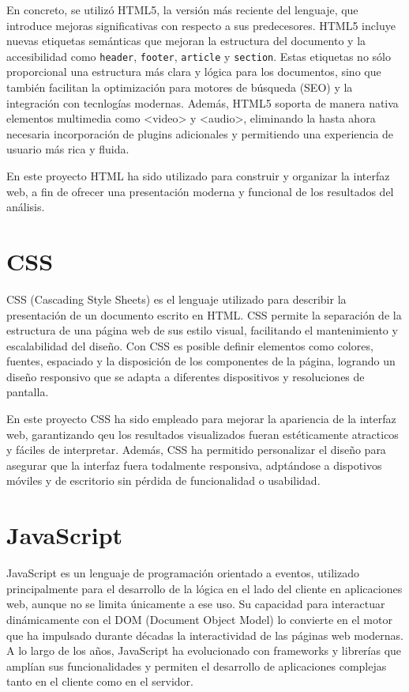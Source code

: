 \documentclass[a4paper, 12pt]{book}
\begin{document}
En concreto, se utilizó HTML5, la versión más reciente del lenguaje, que introduce mejoras significativas con respecto a sus predecesores. HTML5 incluye nuevas etiquetas semánticas que mejoran la estructura del documento y la accesibilidad como \texttt{header}, \texttt{footer}, \texttt{article} y \texttt{section}. Estas etiquetas no sólo proporcional una estructura más clara y lógica para los documentos, sino que también facilitan la optimización para motores de búsqueda (SEO) y la integración con tecnlogías modernas. Además, HTML5 soporta de manera nativa elementos multimedia como <video> y <audio>, eliminando la hasta ahora necesaria incorporación de plugins adicionales y permitiendo una experiencia de usuario más rica y fluida.

En este proyecto HTML ha sido utilizado para construir y organizar la interfaz web, a fin de ofrecer una presentación moderna y funcional de los resultados del análisis.

\section{CSS}
CSS (Cascading Style Sheets) es el lenguaje utilizado para describir la presentación de un documento escrito en HTML. CSS permite la separación de la estructura de una página web de sus estilo visual, facilitando el mantenimiento y escalabilidad del diseño. Con CSS es posible definir elementos como colores, fuentes, espaciado y la disposición de los componentes de la página, logrando un diseño responsivo que se adapta a diferentes dispositivos y resoluciones de pantalla.

En este proyecto CSS ha sido empleado para mejorar la apariencia de la interfaz web, garantizando qeu los resultados visualizados fueran estéticamente atracticos y fáciles de interpretar. Además, CSS ha permitido personalizar el diseño para asegurar que la interfaz fuera todalmente responsiva, adptándose a dispotivos móviles y de escritorio sin pérdida de funcionalidad o usabilidad.

\section{JavaScript}
JavaScript es un lenguaje de programación orientado a eventos, utilizado principalmente para el desarrollo de la lógica en el lado del cliente en aplicaciones web, aunque no se limita únicamente a ese uso. Su capacidad para interactuar dinámicamente con el DOM (Document Object Model) lo convierte en el motor que ha impulsado durante décadas la interactividad de las páginas web modernas. A lo largo de los años, JavaScript ha evolucionado con frameworks y librerías que amplían sus funcionalidades y permiten el desarrollo de aplicaciones complejas tanto en el cliente como en el servidor.
\end{document}
